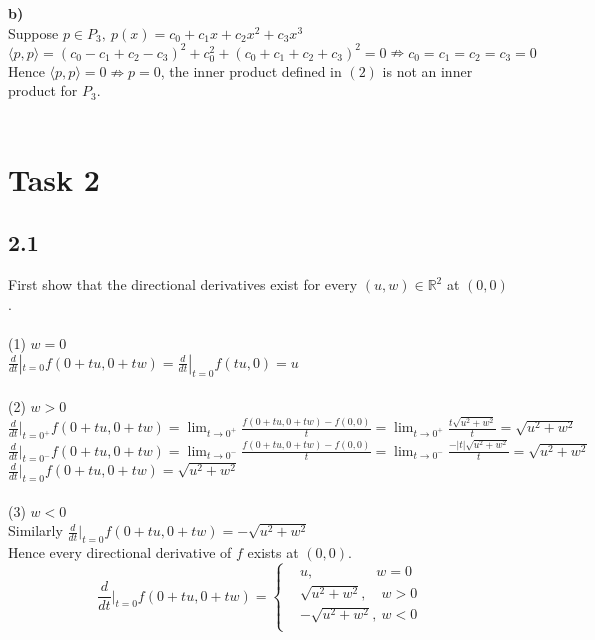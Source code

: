 \documentclass[12pt,a4paper,titlepage]{article}
\begin{document}
\textbf{b)}\\
Suppose $p\in P_3, \: p(x)=c_0+c_1 x+c_2 x^2+c_3 x^3$\\
$\langle p,p\rangle = (c_0-c_1+c_2-c_3)^2+c_0^2+(c_0+c_1+c_2+c_3)^2=0 
\nRightarrow c_0=c_1=c_2=c_3=0$\\
Hence $\langle p,p\rangle=0 \nRightarrow p=0$, the inner product defined in $(2)$ is 
not an inner product for $P_3$.\\\\

\section*{Task 2}

\subsection*{2.1}
First show that the directional derivatives exist for every $(u,w)\in \mathbb{R}^2$
 at $(0,0)$.\\\\
(1) $w=0$\\
$\frac{d}{dt}|_{t=0}f(0+tu,0+tw)=\frac{d}{dt}|_{t=0}f(tu,0)=u$\\\\
(2) $w>0$\\
$\frac{d}{dt}|_{t=0^+}f(0+tu,0+tw) = \lim_{t\to 0^+}\frac{f(0+tu,0+tw)-f(0,0)}{t}
 = \lim_{t\to 0^+}\frac{t\sqrt{u^2+w^2}}{t} = \sqrt{u^2+w^2}$\\
$\frac{d}{dt}|_{t=0^-}f(0+tu,0+tw) = \lim_{t\to 0^-}\frac{f(0+tu,0+tw)-f(0,0)}{t}
 = \lim_{t\to 0^-}\frac{-|t|\sqrt{u^2+w^2}}{t} = \sqrt{u^2+w^2}$\\
$\frac{d}{dt}|_{t=0}f(0+tu,0+tw) = \sqrt{u^2+w^2}$\\\\
(3) $w<0$\\
Similarly $\frac{d}{dt}|_{t=0}f(0+tu,0+tw) = -\sqrt{u^2+w^2}$\\

Hence every directional derivative of $f$ exists at $(0,0)$.\\
\[
\frac{d}{dt}|_{t=0}f(0+tu,0+tw)=
\begin{cases}
& u, \qquad\qquad\:\: w=0\\
& \sqrt{u^2+w^2}, \quad w>0\\
& -\sqrt{u^2+w^2}, \: w<0\\
\end{cases}
\]
\end{document}
